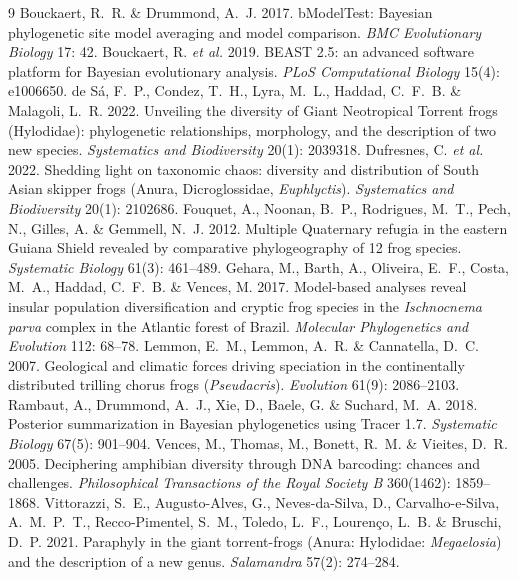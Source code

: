 \documentclass[11pt,a4paper]{article}
\begin{document}
\begin{thebibliography}{9}
 Bouckaert, R.~R. \& Drummond, A.~J. 2017. bModelTest: Bayesian
phylogenetic site model averaging and model comparison. \emph{BMC Evolutionary Biology} 17: 42.
 Bouckaert, R. \emph{et al.} 2019. BEAST 2.5: an advanced software
platform for Bayesian evolutionary analysis. \emph{PLoS Computational Biology} 15(4): e1006650.
 de Sá, F.~P., Condez, T.~H., Lyra, M.~L., Haddad, C.~F.~B. \& Malagoli,
L.~R. 2022. Unveiling the diversity of Giant Neotropical Torrent frogs (Hylodidae):
phylogenetic relationships, morphology, and the description of two new species.
\emph{Systematics and Biodiversity} 20(1): 2039318.
 Dufresnes, C. \emph{et al.} 2022. Shedding light on taxonomic chaos:
diversity and distribution of South Asian skipper frogs (Anura, Dicroglossidae,
\emph{Euphlyctis}). \emph{Systematics and Biodiversity} 20(1): 2102686.
 Fouquet, A., Noonan, B.~P., Rodrigues, M.~T., Pech, N., Gilles, A. \&
Gemmell, N.~J. 2012. Multiple Quaternary refugia in the eastern Guiana Shield revealed by
comparative phylogeography of 12 frog species. \emph{Systematic Biology} 61(3): 461--489.
 Gehara, M., Barth, A., Oliveira, E.~F., Costa, M.~A., Haddad, C.~F.~B.
\& Vences, M. 2017. Model-based analyses reveal insular population diversification and cryptic
frog species in the \emph{Ischnocnema parva} complex in the Atlantic forest of Brazil.
\emph{Molecular Phylogenetics and Evolution} 112: 68--78.
 Lemmon, E.~M., Lemmon, A.~R. \& Cannatella, D.~C. 2007. Geological and
climatic forces driving speciation in the continentally distributed trilling chorus frogs
(\emph{Pseudacris}). \emph{Evolution} 61(9): 2086--2103.
 Rambaut, A., Drummond, A.~J., Xie, D., Baele, G. \& Suchard, M.~A.
2018. Posterior summarization in Bayesian phylogenetics using Tracer 1.7. \emph{Systematic
Biology} 67(5): 901--904.
 Vences, M., Thomas, M., Bonett, R.~M. \& Vieites, D.~R. 2005.
Deciphering amphibian diversity through DNA barcoding: chances and challenges.
\emph{Philosophical Transactions of the Royal Society B} 360(1462): 1859--1868.
 Vittorazzi, S.~E., Augusto-Alves, G., Neves-da-Silva, D.,
Carvalho-e-Silva, A.~M.~P.~T., Recco-Pimentel, S.~M., Toledo, L.~F., Lourenço, L.~B. \&
Bruschi, D.~P. 2021. Paraphyly in the giant torrent-frogs (Anura: Hylodidae:
\emph{Megaelosia}) and the description of a new genus. \emph{Salamandra} 57(2): 274--284.
\end{thebibliography}
\end{document}
